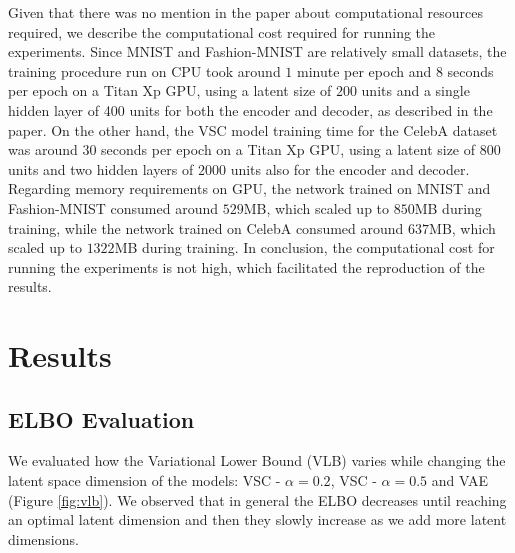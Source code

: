 Given that there was no mention in the paper about computational resources required, we describe the computational cost required for running the experiments. Since MNIST and Fashion-MNIST are relatively small datasets, the training procedure run on CPU took around $1$ minute per epoch and $8$ seconds per epoch on a Titan Xp GPU, using a latent size of $200$ units and a single hidden layer of 400 units for both the encoder and decoder, as described in the paper. On the other hand, the VSC model training time for the CelebA dataset was around $30$ seconds per epoch on a Titan Xp GPU, using a latent size of $800$ units and two hidden layers of $2000$ units also for the encoder and decoder. Regarding memory requirements on GPU, the network trained on MNIST and Fashion-MNIST consumed around $529$MB, which scaled up to $850$MB during training, while the network trained on CelebA consumed around $637$MB, which scaled up to $1322$MB during training. In conclusion, the computational cost for running the experiments is not high, which facilitated the reproduction of the results.

\section{Results}

\subsection{ELBO Evaluation}
We evaluated how the Variational Lower Bound (VLB) varies while changing the latent space dimension of the models: VSC - $\alpha = 0.2$, VSC - $\alpha = 0.5$ and VAE (Figure \ref{fig:vlb}). We observed that in general the ELBO decreases until reaching an optimal latent dimension and then they slowly increase as we add more latent dimensions. 

